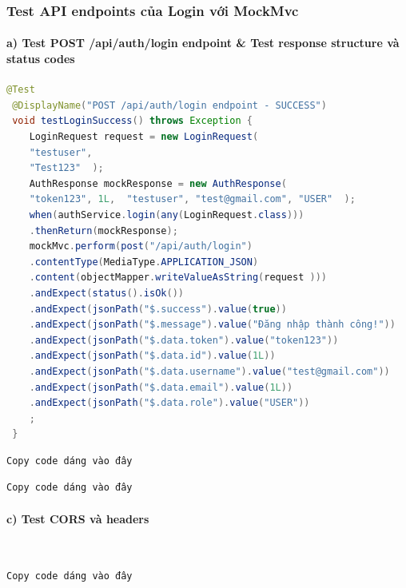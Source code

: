 \documentclass[a4paper,12pt]{article}
\begin{document}
\subsubsection{Test API endpoints của Login với MockMvc}
\paragraph{a) Test POST /api/auth/login endpoint & Test response structure và status codes}\mbox{}
\begin{lstlisting}[language=Java, caption=POST /api/auth/login endpoint - SUCCESS]
 @Test
 @DisplayName("POST /api/auth/login endpoint - SUCCESS")
 void testLoginSuccess() throws Exception {
	LoginRequest request = new LoginRequest(
	"testuser",
	"Test123"  );
	AuthResponse mockResponse = new AuthResponse(
	"token123", 1L,  "testuser", "test@gmail.com", "USER"  );
	when(authService.login(any(LoginRequest.class)))
	.thenReturn(mockResponse);
	mockMvc.perform(post("/api/auth/login")
	.contentType(MediaType.APPLICATION_JSON)
	.content(objectMapper.writeValueAsString(request )))
	.andExpect(status().isOk())
	.andExpect(jsonPath("$.success").value(true))
	.andExpect(jsonPath("$.message").value("Đăng nhập thành công!"))
	.andExpect(jsonPath("$.data.token").value("token123"))
	.andExpect(jsonPath("$.data.id").value(1L))
	.andExpect(jsonPath("$.data.username").value("test@gmail.com"))
	.andExpect(jsonPath("$.data.email").value(1L))
	.andExpect(jsonPath("$.data.role").value("USER"))
	;
 }

\end{lstlisting}

\begin{lstlisting}[language=javaScript, caption=POST /api/auth/login endpoint - FAILED username không tồn tại]
    Copy code dáng vào đây
\end{lstlisting}

\begin{lstlisting}[language=javaScript, caption=POST /api/auth/login endpoint - FAILED Password sai]
    Copy code dáng vào đây
\end{lstlisting}
\paragraph{c) Test CORS và headers}\mbox{}\\
\begin{lstlisting}[language=javaScript, caption= Kiểm tra CORS headers cho POST request
]
    Copy code dáng vào đây
\end{lstlisting}
\end{document}
